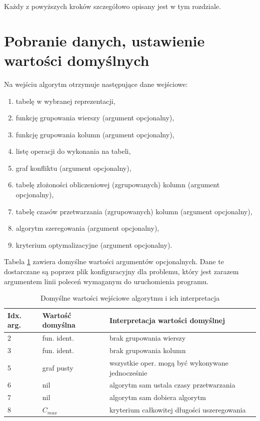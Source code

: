 \documentclass[brudnopis]{xmgr}
\begin{document}
Każdy z powyższych kroków szczegółowo opisany jest w tym rozdziale.
\newpage


\section{Pobranie danych, ustawienie wartości domyślnych}

Na wejściu algorytm otrzymuje następujące dane wejściowe:
\begin{enumerate}
    \item tabelę w wybranej reprezentacji,
    \item funkcję grupowania wierszy (argument opcjonalny),
    \item funkcję grupowania kolumn (argument opcjonalny),
    \item listę operacji do wykonania na tabeli,
    \item graf konfliktu (argument opcjonalny),
    \item tabelę złożoności obliczeniowej (zgrupowanych) kolumn (argument opcjonalny),
    \item tabelę czasów przetwarzania (zgrupowanych) kolumn (argument opcjonalny),
    \item algorytm szeregowania (argument opcjonalny),
    \item kryterium optymalizacyjne (argument opcjonalny).
\end{enumerate}

Tabela \ref{tab:args-default} zawiera domyślne wartości argumentów opcjonalnych. Dane te dostarczane są poprzez plik konfiguracyjny dla problemu, który jest zarazem argumentem linii poleceń wymaganym do uruchomienia programu.
\medskip

\begin{table}[!tbh]
\begin{tabular}{|l|l|l|} \hline
Idx. arg. & Wartość domyślna & Interpretacja wartości domyślnej \\ \hline
2 & fun. ident. & brak grupowania wierszy \\ \hline
3 & fun. ident. & brak grupowania kolumn \\ \hline
5 & graf pusty  & wszystkie oper. mogą być wykonywane jednocześnie \\ \hline
6 & nil         & algorytm sam ustala czasy przetwarzania \\ \hline
7 & nil         & algorytm sam dobiera algorytm \\ \hline
8 & $C_{max}$   & kryterium całkowitej długości uszeregowania \\ \hline
\end{tabular}
\caption{Domyślne wartości wejściowe algorytmu i ich interpretacja\label{tab:args-default}}
\end{table}
\medskip
\end{document}
